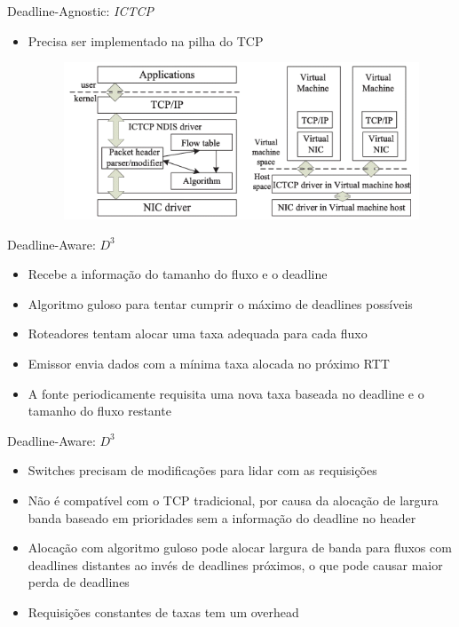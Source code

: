 \documentclass[aspectratio=169]{beamer}
\begin{document}
	\begin{frame} {Deadline-Agnostic: \textit{ICTCP}}
	    
	    \Large
	    \begin{itemize}
	                           
	    \item
	      Precisa ser implementado na pilha do TCP
	  
	    \begin{figure}[ht]    
	        \includegraphics[scale=0.7]{imagens/ictcp_pilha.png}
	    \end{figure}
	        
	  \end{itemize}
	    
	\end{frame}  


    \begin{frame} {Deadline-Aware: $D^3$}
		\begin{itemize}
		 	\item
		 		Recebe a informação do tamanho do fluxo e o deadline
		 	\item
				Algoritmo guloso para tentar cumprir o máximo de deadlines possíveis
		 	\item
				Roteadores tentam alocar uma taxa adequada para cada fluxo
		 	\item
				Emissor envia dados com a mínima taxa alocada no próximo RTT
		 	\item
				A fonte periodicamente requisita uma nova taxa baseada no deadline e o tamanho do fluxo restante
		 \end{itemize}
	\end{frame}

	\begin{frame} {Deadline-Aware: $D^3$}
		\begin{itemize}
		 	\item
		 		Switches precisam de modificações para lidar com as requisições
		 	\item
				Não é compatível com o TCP tradicional, por causa da alocação de largura banda baseado em prioridades sem a informação do deadline no header
		 	\item
				Alocação com algoritmo guloso pode alocar largura de banda para fluxos com deadlines distantes ao invés de deadlines próximos, o que pode causar maior perda de deadlines
		 	\item
				Requisições constantes de taxas tem um overhead
		 \end{itemize}
	\end{frame}
\end{document}
